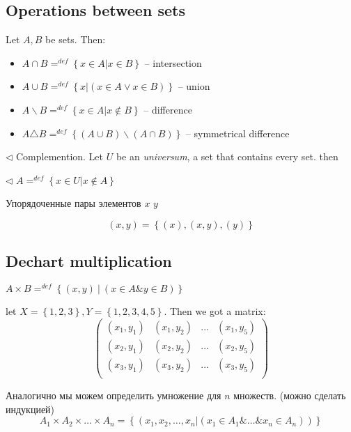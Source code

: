 \subsection{Operations between sets}

Let $A, B$ be sets. Then:
	\begin{itemize}
		\item $A \cap B =^{def} \left\{ x \in A | x \in B \right\}$ -- intersection
		\item $A \cup B =^{def} \left\{ x | (x \in A \vee x \in B) \right\}$ -- union
		\item $A \backslash B =^{def} \left\{ x \in A | x \notin B \right\}$ -- difference
		\item $A \triangle B =^{def} \left\{ (A \cup B) \backslash (A \cap B) \right\}	$ -- symmetrical difference
\end{itemize}

$\triangleleft$  Complemention. Let $U$ be an {\it{universum}}, a set that contains every set. then 

$\triangleleft$ $A = ^{def} \left\{ x \in U | x \notin A \right\}$

Упорядоченные пары элементов $x$ $y$ 

\[
	(x,y) = \left\{ (x), (x,y), (y) \right\}
\]

\subsection{Dechart multiplication}

\begin{definition}[]
	$A \times B =^{def} \left\{ (x, y) \ | \ (x \in A \& y \in B) \right\}$ 
\end{definition}


\begin{example}[]
	let $X = \left\{ 1,2,3 \right\}, Y = \left\{ 1,2,3,4,5 \right\}$. Then we got a matrix:
	\[
		\begin{pmatrix} 
		(x_1, y_1) & (x_1, y_2) & ... & (x_1, y_5) \\	
		(x_2, y_1) & (x_2, y_2) & ... & (x_2, y_5) \\	
		(x_3, y_1) & (x_3, y_2) & ... & (x_3, y_5) \\	
	\end{pmatrix}
	\]
\end{example}



Аналогично мы можем определить умножение для $n$ множеств. (можно сделать индукцией)
\[
	A_1 \times A_2 \times \dots \times A_n = \left\{ (x_1,x_2, \dots, x_n | (x_1 \in A_1 \& \dots \& x_n \in A_n)) \right\}
\]

